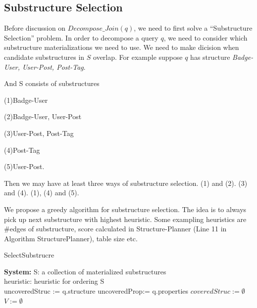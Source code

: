 \subsection{Substructure Selection}
\label{Substructure Selection}

Before discussion on $Decompose\_Join(q)$, we need to first solve a ``Substructure Selection'' problem. In order to decompose a query $q$, we need to consider which substructure materializations we need to use. We need to make dicision when candidate substructures in $S$ overlap. For example suppose $q$ has structure \textit{Badge-User, User-Post, Post-Tag}.

And S consists of substructures 

(1)Badge-User

(2)Badge-User, User-Post 

(3)User-Post, Post-Tag

(4)Post-Tag

(5)User-Post.

Then we may have at least three ways of substructure selection. (1) and (2). (3) and (4).
(1), (4) and (5).

We propose a greedy algorithm for substructure selection. The idea is to always pick up next substructure with highest heuristic. Some exampling heuristics are \#edges of substructure, score calculated in Structure-Planner (Line 11 in Algorithm StructurePlanner), table size etc. 

\begin{algorithm}[H]
	\caption{SelectSubstrucre}
	\LinesNumbered
	\textbf{System:} S: a collection of materialized substructures\\ heuristic: heuristic for ordering S\\
	uncoveredStruc := q.structure \;
	uncoveredProp:= q.properties \; 
	$coveredStruc:= \emptyset$ \;
	$V:=\emptyset $\;
\end{algorithm}
\clearpage

